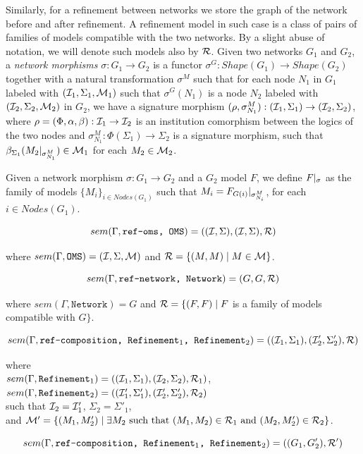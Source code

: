 \documentclass[10pt,fleqn,%
\ifpretendfinal
final%
\else
draft%
\fi,
]{scrreprt}
\newcommand*{\syntax}[1]{\texttt{#1}}
\begin{document}
Similarly, for a refinement between networks we store the graph of the network before and after refinement.
A refinement model in such case is a class of pairs of families of models compatible with the two networks. By
a slight abuse of notation, we will denote such models also by ${\cal R}$. 
Given two networks $G_1$ and $G_2$, a \emph{network morphisms} 
$\sigma : G_1\to G_2$ is a 
functor $\sigma^G: Shape(G_1)\to Shape(G_2)$ 
together with a natural transformation $\sigma^M$ such that
for each node $N_1$ in $G_1$ labeled with $({\cal I}_1, \Sigma_1, {\cal M}_1)$
such that $\sigma^G(N_1)$ is a node $N_2$ labeled with $({\cal I}_2,\Sigma_2,{\cal M}_2)$ in $G_2$,
we have a signature morphism $(\rho,\sigma^M_{N_1}) : ({\cal I}_1, \Sigma_1) \to ({\cal I}_2, \Sigma_2)$,
where $\rho = (\Phi, \alpha, \beta) : {\cal I}_1 \to {\cal I}_2$ is an institution comorphism between the logics of the two nodes and
$\sigma^M_{N_1} : \Phi(\Sigma_1) \to \Sigma_2$ is a signature morphism,
such that $\beta_{\Sigma_1}(M_2|_{\sigma^M_{N_1}}) \in {\cal M}_1$ for each $M_2 \in  {\cal M}_2$.

Given a network morphism $\sigma:G_1\to G_2$ and a $G_2$ model $F$, 
we define $F|_{\sigma}$ as the family of models $\{M_i\}_{i\in Nodes(G_1)}$ such that
$M_i = F_{G(i)}|_{\sigma^M_{N_i}}$, for each $i\in Nodes(G_1)$.

$$sem(\Gamma, \syntax{ref-oms, OMS}) = ((\cI,\Sigma),(\cI,\Sigma),\cR)$$

where $sem(\Gamma, \syntax{OMS}) = (\cI, \Sigma, \cM)$ and ${\cal R}=\{ (M,M) \mid M\in {\cal M} \}$.

$$sem(\Gamma, \syntax{ref-network, Network}) = (G,G, \cR)$$

where $sem(\Gamma, \syntax{Network}) = G$ and
${\cal R} = \{(F,F) \mid F $ is a family of models compatible with $G\}$.

$$sem(\Gamma, \syntax{ref-composition, Refinement$_1$, Refinement$_2$}) = (
 (\cI_1,\Sigma_1),
 (\cI'_2,\Sigma'_2),
 \cR
)$$

where\\ 
$sem(\Gamma, \syntax{Refinement}_1) = ((\cI_1,\Sigma_1),(\cI_2,\Sigma_2),\cR_1)$,\\
$sem(\Gamma, \syntax{Refinement}_2) = ((\cI'_1,\Sigma'_1),(\cI'_2,\Sigma'_2),\cR_2)$\\
such that 
${\cal I}_2 = {\cal I}'_1$, $\Sigma_2 = \Sigma'_1$,\\
and
${\cal M}' = \{ (M_1, M'_2) \mid \exists M_2 \text{ such that } (M_1, M_2)\in{\cal R}_1 \text{ and } (M_2, M'_2) \in {\cal R}_2\}$.

$$sem(\Gamma, \syntax{ref-composition, Refinement$_1$, Refinement$_2$}) = ((G_1, G'_2),\cR')$$
\end{document}
